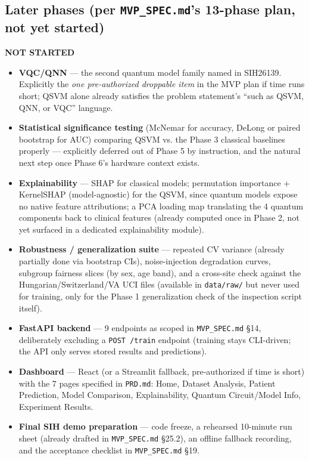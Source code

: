 \documentclass[11pt,a4paper]{article}
\newcommand{\code}[1]{\texttt{\small #1}}
\newcommand{\pending}{\textcolor{mustcolor}{\textbf{NOT STARTED}}}
\begin{document}
\subsection{Later phases (per \code{MVP\_SPEC.md}'s 13-phase plan, not yet started)}
\pending

\begin{itemize}[leftmargin=1.4em]
  \item \textbf{VQC/QNN} --- the second quantum model family named in SIH26139. Explicitly the \emph{one pre-authorized droppable item} in the MVP plan if time runs short; QSVM alone already satisfies the problem statement's ``such as QSVM, QNN, or VQC'' language.
  \item \textbf{Statistical significance testing} (McNemar for accuracy, DeLong or paired bootstrap for AUC) comparing QSVM vs. the Phase 3 classical baselines properly --- explicitly deferred out of Phase 5 by instruction, and the natural next step once Phase 6's hardware context exists.
  \item \textbf{Explainability} --- SHAP for classical models; permutation importance + KernelSHAP (model-agnostic) for the QSVM, since quantum models expose no native feature attributions; a PCA loading map translating the 4 quantum components back to clinical features (already computed once in Phase 2, not yet surfaced in a dedicated explainability module).
  \item \textbf{Robustness / generalization suite} --- repeated CV variance (already partially done via bootstrap CIs), noise-injection degradation curves, subgroup fairness slices (by sex, age band), and a cross-site check against the Hungarian/Switzerland/VA UCI files (available in \code{data/raw/} but never used for training, only for the Phase 1 generalization check of the inspection script itself).
  \item \textbf{FastAPI backend} --- 9 endpoints as scoped in \code{MVP\_SPEC.md} \S14, deliberately excluding a \code{POST /train} endpoint (training stays CLI-driven; the API only serves stored results and predictions).
  \item \textbf{Dashboard} --- React (or a Streamlit fallback, pre-authorized if time is short) with the 7 pages specified in \code{PRD.md}: Home, Dataset Analysis, Patient Prediction, Model Comparison, Explainability, Quantum Circuit/Model Info, Experiment Results.
  \item \textbf{Final SIH demo preparation} --- code freeze, a rehearsed 10-minute run sheet (already drafted in \code{MVP\_SPEC.md} \S25.2), an offline fallback recording, and the acceptance checklist in \code{MVP\_SPEC.md} \S19.
\end{itemize}
\end{document}
